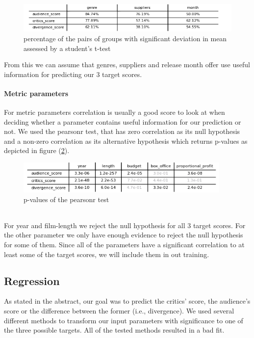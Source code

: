\documentclass{article}
\begin{document}
    \noindent
    \begin{figure}[t]
        \centering
        \includegraphics[width=1\textwidth]{imgs/prozent.png}
        \caption{percentage of the pairs of groups with significant deviation in mean assessed by a student's t-test}
        \label{fig:hypo_rejection}
    \end{figure}
    From this we can assume that genres, suppliers and release month offer use useful information for predicting our 3 target scores.
    \paragraph{Metric parameters}
    For metric parameters correlation is usually a good score to look at when deciding whether a parameter contains useful information for our prediction or not. We used the pearsonr test, that has zero correlation as its null hypothesis and a non-zero correlation as its alternative hypothesis which returns p-values as depicted in figure (\ref{fig:hypo_rejection}).\\
    \noindent
    \begin{figure}[t]
        \centering
        \includegraphics[width=0.94\textwidth]{imgs/metric_p.png}
        \caption{p-values of the pearsonr test}
        \label{fig:hypo_rejection}
    \end{figure}\\
    For year and film-length we reject the null hypothesis for all 3 target scores. For the other parameter we only have enough evidence to reject the null hypothesis for some of them. Since all of the parameters have a significant correlation to at least some of the target scores, we will include them in out training.
    
    
\subsection{Regression}
    As stated in the abstract, our goal was to predict the critics' score, the audience's score or the difference between the former (i.e., divergence).
    We used several different methods to transform our input parameters with significance to one of the three possible targets. All of the tested methods resulted in a bad fit.
\end{document}
